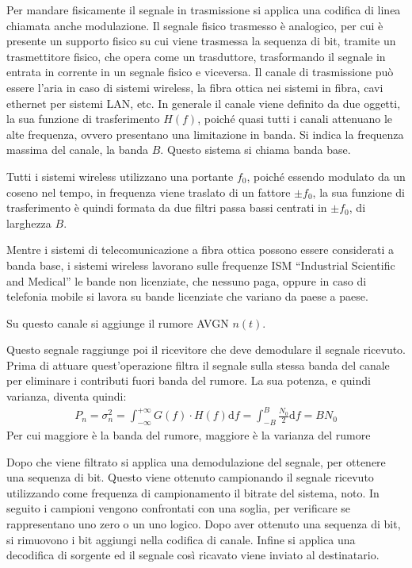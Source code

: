 \documentclass{article}
\newcommand{\df}{\mathrm{d}}
\numberwithin{equation}{subsection}
\begin{document}
Per mandare fisicamente il segnale in trasmissione si applica una codifica di linea chiamata anche modulazione. 
Il segnale fisico trasmesso è analogico, per cui è presente un supporto fisico su cui viene trasmessa la sequenza di bit, tramite un trasmettitore fisico, che opera come un 
trasduttore, trasformando il segnale in entrata in corrente in un segnale fisico e viceversa. 
Il canale di trasmissione può essere l'aria in caso di sistemi wireless, la fibra ottica nei sistemi in fibra, cavi ethernet per sistemi LAN, 
etc. In generale il canale viene definito da due oggetti, la sua funzione di trasferimento $H(f)$, poiché quasi tutti i canali attenuano le alte frequenza, ovvero presentano 
una limitazione in banda. Si indica la frequenza massima del canale, la banda $B$. Questo sistema si chiama banda base. 

Tutti i sistemi wireless utilizzano una portante $f_0$, poiché essendo modulato da un coseno nel tempo, in frequenza viene 
traslato di un fattore $\pm f_0$, la sua funzione di trasferimento è quindi formata da due filtri passa bassi centrati in $\pm f_0$, di larghezza $B$. 

Mentre i sistemi di telecomunicazione a fibra ottica possono essere considerati a banda base, i sistemi wireless lavorano sulle frequenze ISM ``Industrial Scientific and Medical'' 
le bande non licenziate, che nessuno paga, oppure in caso di telefonia mobile si lavora su bande licenziate che variano da paese a paese. 

Su questo canale si aggiunge il rumore AVGN $n(t)$. 

Questo segnale raggiunge poi il ricevitore che deve demodulare il segnale ricevuto. Prima di attuare quest'operazione filtra il segnale sulla stessa banda del canale per 
eliminare i contributi fuori banda del rumore. La sua potenza, e quindi varianza, diventa quindi:
\begin{gather*}
    P_n=\sigma_n^2=\displaystyle\int_{-\infty}^{+\infty}G(f)\cdot H(f)\df f=\int_{-B}^B\frac{N_0}{2}\df f=BN_0
\end{gather*}
Per cui maggiore è la banda del rumore, maggiore è la varianza del rumore

Dopo che viene filtrato si applica una demodulazione del segnale, per ottenere una sequenza di bit. Questo viene ottenuto campionando il segnale ricevuto utilizzando 
come frequenza di campionamento il bitrate del sistema, noto. In seguito i campioni vengono confrontati con una soglia, per verificare se rappresentano uno zero o un uno 
logico. 
Dopo aver ottenuto una sequenza di bit, si rimuovono i bit aggiungi nella codifica di canale. Infine si applica una decodifica di sorgente ed il segnale così ricavato 
viene inviato al destinatario. 
\end{document}
